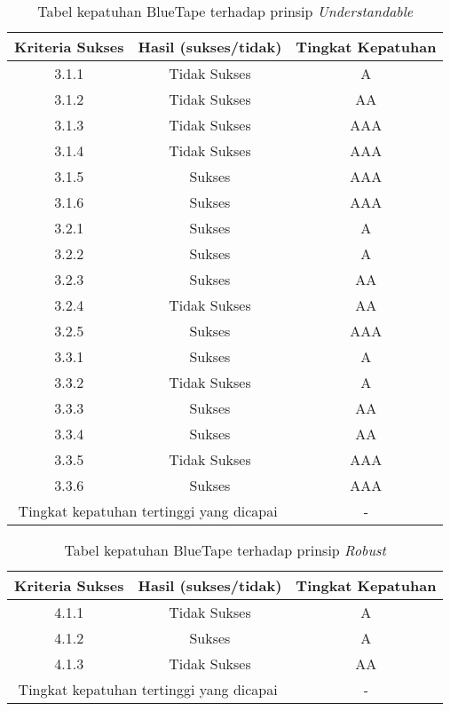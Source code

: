 \begin{table}[H]
    \centering 
    \caption{Tabel kepatuhan BlueTape terhadap prinsip \textit{Understandable}}
    \label{tab:kepatuhan_bluetape_understandable}
    \begin{tabular}{|c|c|c|}
        \toprule
        Kriteria Sukses & Hasil (sukses/tidak) & Tingkat Kepatuhan \\

        \midrule
        3.1.1 & Tidak Sukses & A \\
        3.1.2 & Tidak Sukses & AA \\
        3.1.3 & Tidak Sukses & AAA \\
        3.1.4 & Tidak Sukses & AAA \\
        3.1.5 & Sukses & AAA \\
        3.1.6 & Sukses & AAA \\
        3.2.1 & Sukses & A \\
        3.2.2 & Sukses & A \\
        3.2.3 & Sukses & AA \\
        3.2.4 & Tidak Sukses & AA \\
        3.2.5 & Sukses & AAA \\
        3.3.1 & Sukses & A \\
        3.3.2 & Tidak Sukses & A \\
        3.3.3 & Sukses & AA \\
        3.3.4 & Sukses & AA \\
        3.3.5 & Tidak Sukses & AAA \\
        3.3.6 & Sukses & AAA \\

        \bottomrule
        \multicolumn{2}{|c|}{Tingkat kepatuhan tertinggi yang dicapai} & - \\
        \bottomrule

    \end{tabular}
\end{table}
\begin{table}[H]
    \centering 
    \caption{Tabel kepatuhan BlueTape terhadap prinsip \textit{Robust}}
    \label{tab:kepatuhan_bluetape_robust}
    \begin{tabular}{|c|c|c|}
        \toprule
        Kriteria Sukses & Hasil (sukses/tidak) & Tingkat Kepatuhan\\

        \midrule
        4.1.1 & Tidak Sukses & A \\
        4.1.2 & Sukses & A \\
        4.1.3 & Tidak Sukses & AA \\

        \bottomrule
        \multicolumn{2}{|c|}{Tingkat kepatuhan tertinggi yang dicapai} & - \\
        \bottomrule

    \end{tabular} 
\end{table}

